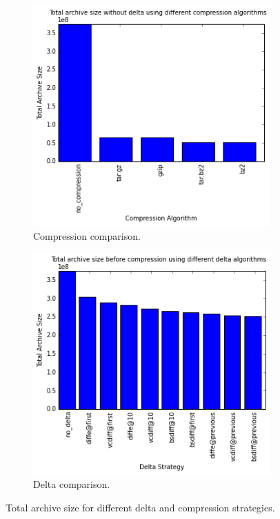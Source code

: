\documentclass[11pt]{article}
\begin{document}
\begin{figure}
\centering
\begin{subfigure}{.5\textwidth}
  \centering
  \includegraphics[width=\linewidth]{images/tas_compression.png}
  \caption{Compression comparison.}
\end{subfigure}%
\begin{subfigure}{.5\textwidth}
  \centering
  \includegraphics[width=\linewidth]{images/tas_delta.png}
  \caption{Delta comparison.}
  \label{fig:tas_delta_compression:b}
\end{subfigure}
\caption{Total archive size for different delta and compression strategies.}
\label{fig:tas_delta_compression}
\end{figure}
\end{document}
